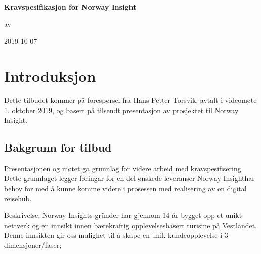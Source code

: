 \documentclass{article}
\begin{document}
\newcommand{\suppliername}{Ilder AS }
\newcommand{\supplieradress}{Brugata 6, 5200 Os }

\newcommand{\customername}{Norway Insight}
\newcommand{\customeradress}{Holmedalsgården 3, 2 Floor. 5003 Bergen}

\newcommand{\commencedate}{2019-10-07}










\vspace{2.5in}
\begingroup
\centering
\par\normalfont\fontsize{15}{20}\sffamily\selectfont
\textbf{Kravspesifikasjon for Norway Insight}\\
{\LARGE }\par %
\vspace*{1cm}
{\large{av} }\par 
\vspace{2cm} 
\begin{center}
  \centering
  
\end{center}
{\small{\commencedate} }\par %
\endgroup
\setlength{}
\renewcommand{\epigraphflush}{center}


\newpage
\section{Introduksjon}
Dette tilbudet kommer på forespørsel fra Hans Petter Torsvik, avtalt i videomøte 1. oktober 2019, og basert på tilsendt presentasjon av prosjektet til Norway Insight.

\subsection{Bakgrunn for tilbud}
Presentasjonen og møtet ga grunnlag for videre arbeid med kravspesifisering. Dette grunnlaget legger føringar for en del ønskede leveranser \customername har behov for med å kunne komme videre i prosessen med realisering av en digital reisehub. 

Beskrivelse: \break
Norway Insights gründer har gjennom 14 år bygget opp et unikt nettverk og en innsikt innen bærekraftig opplevelsesbasert turisme på Vestlandet. Denne innsikten gir oss mulighet til å skape en unik kundeopplevelse i 3 dimensjoner/faser;
\end{document}
